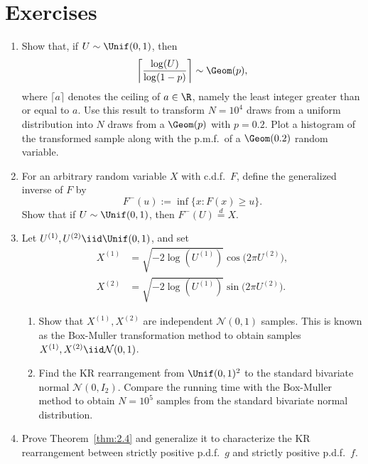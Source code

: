 \section{Exercises}
\label{sec:2.4}

\begin{enumerate}

\item[2.1] Show that, if $U \sim \Unif(0,1)$, then
\[
  \left\lceil \frac{\log(U)}{\log(1-p)} \right\rceil \sim \Geom(p),
\]
where $\lceil a \rceil$ denotes the ceiling of $a \in \R$, namely the least integer greater than or equal to $a$.
Use this result to transform $N = 10^4$ draws from a uniform distribution into $N$ draws from a
$\Geom(p)$ with $p = 0.2$. Plot a histogram of the transformed sample along with the p.m.f.\ of
a $\Geom(0.2)$ random variable.

\item[2.2] For an arbitrary random variable $X$ with c.d.f.\ $F$, define the generalized inverse of $F$ by
\[
  F^-(u) := \inf\{x : F(x) \ge u\}.
\]
Show that if $U \sim \Unif(0,1)$, then $F^-(U) \overset{d}{=} X$.

\item[2.3] Let $U^{(1)}, U^{(2)} \iid \Unif(0,1)$, and set
\begin{align*}
  X^{(1)} &= \sqrt{-2\log(U^{(1)})}\cos\!\bigl(2\pi U^{(2)}\bigr), \\
  X^{(2)} &= \sqrt{-2\log(U^{(1)})}\sin\!\bigl(2\pi U^{(2)}\bigr).
\end{align*}

\begin{enumerate}[label=\alph*)]
  \item Show that $X^{(1)}, X^{(2)}$ are independent $\mathcal{N}(0,1)$ samples. This is known as the Box-Muller
  transformation method to obtain samples $X^{(1)}, X^{(2)} \iid \mathcal{N}(0,1)$.

  \item Find the KR rearrangement from $\Unif(0,1)^2$ to the standard bivariate normal $\mathcal{N}(0, I_2)$. Compare the running time with the Box-Muller method to obtain $N = 10^5$ samples from the
  standard bivariate normal distribution.
\end{enumerate}

\item[2.4] Prove Theorem~\ref{thm:2.4} and generalize it to characterize the KR rearrangement
between strictly positive p.d.f.\ $g$ and strictly positive p.d.f.\ $f$.


\end{enumerate}
